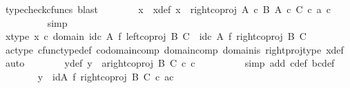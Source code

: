 \begin{isabellebody}
\ {\isacharparenleft}{\kern0pt}typecheck{\isacharunderscore}{\kern0pt}cfuncs{\isacharcomma}{\kern0pt}\ blast{\isacharparenright}{\kern0pt}\isanewline
\ \ \ \ \ \ \isamarkupfalse%
\ x\ \ x{\isacharunderscore}{\kern0pt}def{\isacharcolon}{\kern0pt}\ {\isachardoublequoteopen}x\ {\isacharequal}{\kern0pt}\ right{\isacharunderscore}{\kern0pt}coproj\ {\isacharparenleft}{\kern0pt}A\ {\isasymtimes}\isactrlsub c\ B{\isacharparenright}{\kern0pt}\ {\isacharparenleft}{\kern0pt}A\ {\isasymtimes}\isactrlsub c\ C{\isacharparenright}{\kern0pt}\ {\isasymcirc}\isactrlsub c\ {\isasymlangle}a{\isacharcomma}{\kern0pt}\ c{\isasymrangle}{\isachardoublequoteclose}\isanewline
\ \ \ \ \ \ \ \ \isamarkupfalse%
\ simp\isanewline
\ \ \ \ \ \ \isamarkupfalse%
\ x{\isacharunderscore}{\kern0pt}type{\isacharcolon}{\kern0pt}\ {\isachardoublequoteopen}x\ {\isasymin}\isactrlsub c\ domain\ {\isacharparenleft}{\kern0pt}{\isacharparenleft}{\kern0pt}id\isactrlsub c\ A\ {\isasymtimes}\isactrlsub f\ left{\isacharunderscore}{\kern0pt}coproj\ B\ C{\isacharparenright}{\kern0pt}\ {\isasymamalg}\ {\isacharparenleft}{\kern0pt}id\isactrlsub c\ A\ {\isasymtimes}\isactrlsub f\ right{\isacharunderscore}{\kern0pt}coproj\ B\ C{\isacharparenright}{\kern0pt}{\isacharparenright}{\kern0pt}{\isachardoublequoteclose}\isanewline
\ \ \ \ \ \ \ \ \isamarkupfalse%
\ ac{\isacharunderscore}{\kern0pt}type\ cfunc{\isacharunderscore}{\kern0pt}type{\isacharunderscore}{\kern0pt}def\ codomain{\isacharunderscore}{\kern0pt}comp\ domain{\isacharunderscore}{\kern0pt}comp\ domain{\isacharunderscore}{\kern0pt}is\ right{\isacharunderscore}{\kern0pt}proj{\isacharunderscore}{\kern0pt}type\ x{\isacharunderscore}{\kern0pt}def\ \isamarkupfalse%
\ auto\isanewline
\ \ \ \ \ \ \isamarkupfalse%
\ y{\isacharunderscore}{\kern0pt}def{}{\isacharcolon}{\kern0pt}\ {\isachardoublequoteopen}y\ {\isacharequal}{\kern0pt}\ {\isasymlangle}a{\isacharcomma}{\kern0pt}right{\isacharunderscore}{\kern0pt}coproj\ B\ C\ {\isasymcirc}\isactrlsub c\ c{\isasymrangle}{\isachardoublequoteclose}\isanewline
\ \ \ \ \ \ \ \ \isamarkupfalse%
\ {\isacharparenleft}{\kern0pt}simp\ add{\isacharcolon}{\kern0pt}\ c{\isacharunderscore}{\kern0pt}def\ bc{\isacharunderscore}{\kern0pt}def{\isacharparenright}{\kern0pt}\isanewline
\ \ \ \ \ \ \isamarkupfalse%
\ {\isachardoublequoteopen}y\ {\isacharequal}{\kern0pt}\ {\isacharparenleft}{\kern0pt}id{\isacharparenleft}{\kern0pt}A{\isacharparenright}{\kern0pt}\ {\isasymtimes}\isactrlsub f\ right{\isacharunderscore}{\kern0pt}coproj\ B\ C{\isacharparenright}{\kern0pt}\ {\isasymcirc}\isactrlsub c\ {\isasymlangle}a{\isacharcomma}{\kern0pt}c{\isasymrangle}{\isachardoublequoteclose}\isanewline

\end{isabellebody}
